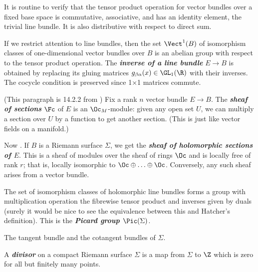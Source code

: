\begin{prop}
	It is routine to verify that the tensor product operation for vector bundles over a fixed base space is commutative, associative, and has an identity element, the trivial line bundle. It is also distributive with respect to direct sum.
\end{prop}
\begin{defn}
	If we restrict attention to line bundles, then the set $\Vect^1(B)$ of isomorphism classes of one-dimensional vector bundles over $B$ is an abelian group with respect to the tensor product operation. The \textbf{\textit{inverse of a line bundle}} $E\to B$ is obtained by replacing its gluing matrices $g_{\beta\alpha}(x)\in\GL_1(\R)$ with their inverses. The cocycle condition is preserved since 1×1 matrices commute.
\end{defn}

\begin{remark}
	(This paragraph is 14.2.2 from \cite{the-rising-sea}) Fix a rank $n$ vector bundle $E\to B$. The \textbf{\textit{sheaf of sections}} $\Fc$ of $E$ is an $\Oc_M$-module: given any open set $U$, we can multiply a section over $U$ by a function to get another section. {\color{cyan}(This is just like vector fields on a manifold.)}
	
	Now \cite{donaldson}. If $B$ is a Riemann surface $\Sigma$, we get the \textbf{\textit{sheaf of holomorphic sections of $E$}}. This is a sheaf of modules over the sheaf of rings $\Oc$ and is locally free of rank $r$; that is, locally isomorphic to $\Oc\oplus\ldots\oplus\Oc$. Conversely, any such sheaf arises from a vector bundle.
\end{remark}
\begin{defn}
	The set of isomorphism classes of holomorphic line bundles forms a group with multiplication operation the fibrewise tensor product and {\color{magenta}inverses given by duals (surely it would be nice to see the equivalence between this and Hatcher's definition)}. This is the \textbf{\textit{Picard group $\Pic(\Sigma)$}}.
\end{defn}
\begin{example}
	The tangent bundle and the cotangent bundles of $\Sigma$.
\end{example}
\begin{defn}
	A \textbf{\textit{divisor}} on a compact Riemann surface $\Sigma$ is a map from $\Sigma$ to $\Z$ which is zero for all but finitely many points.
\end{defn}
	
